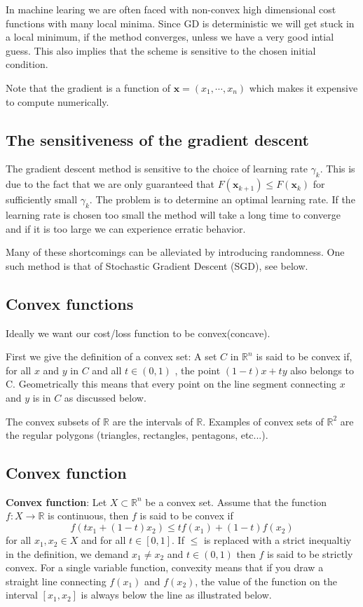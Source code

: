 \documentclass[%
oneside,                 %
final,                   %
10pt]{article}
\begin{document}
In machine learing we are often faced with non-convex high dimensional
cost functions with many local minima. Since GD is deterministic we
will get stuck in a local minimum, if the method converges, unless we
have a very good intial guess. This also implies that the scheme is
sensitive to the chosen initial condition.

Note that the gradient is a function of $\mathbf{x} =
(x_1,\cdots,x_n)$ which makes it expensive to compute numerically.

\subsection*{The sensitiveness of the gradient descent}

The gradient descent method 
is sensitive to the choice of learning rate $\gamma_k$. This is due
to the fact that we are only guaranteed that $F(\mathbf{x}_{k+1}) \leq
F(\mathbf{x}_k)$ for sufficiently small $\gamma_k$. The problem is to
determine an optimal learning rate. If the learning rate is chosen too
small the method will take a long time to converge and if it is too
large we can experience erratic behavior.

Many of these shortcomings can be alleviated by introducing
randomness. One such method is that of Stochastic Gradient Descent
(SGD), see below.

\subsection*{Convex functions}

Ideally we want our cost/loss function to be convex(concave).

First we give the definition of a convex set: A set $C$ in
$\mathbb{R}^n$ is said to be convex if, for all $x$ and $y$ in $C$ and
all $t \in (0,1)$ , the point $(1 − t)x + ty$ also belongs to
C. Geometrically this means that every point on the line segment
connecting $x$ and $y$ is in $C$ as discussed below.

The convex subsets of $\mathbb{R}$ are the intervals of
$\mathbb{R}$. Examples of convex sets of $\mathbb{R}^2$ are the
regular polygons (triangles, rectangles, pentagons, etc...).

\subsection*{Convex function}

\textbf{Convex function}: Let $X \subset \mathbb{R}^n$ be a convex set. Assume that the function $f: X \rightarrow \mathbb{R}$ is continuous, then $f$ is said to be convex if $$f(tx_1 + (1-t)x_2) \leq tf(x_1) + (1-t)f(x_2) $$ for all $x_1, x_2 \in X$ and for all $t \in [0,1]$. If $\leq$ is replaced with a strict inequaltiy in the definition, we demand $x_1 \neq x_2$ and $t\in(0,1)$ then $f$ is said to be strictly convex. For a single variable function, convexity means that if you draw a straight line connecting $f(x_1)$ and $f(x_2)$, the value of the function on the interval $[x_1,x_2]$ is always below the line as illustrated below.
\end{document}
